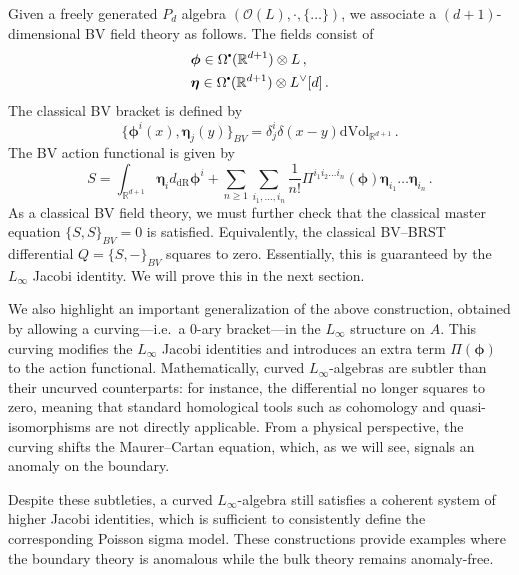 \documentclass[11pt]{article}
\newcommand{\R}{\mathbb{R}}
\newcommand{\derham}{\mathrm{dR}}
\newcommand\sbullet[1][.5]{\mathbin{\vcenter{\hbox{\scalebox{#1}{$\bullet$}}}}}
\numberwithin{equation}{section}
\begin{document}
	
	Given a freely generated $P_d$ algebra $(\mathcal{O}(L),\cdot,\{\dots\})$, we associate a $(d+1)$-dimensional BV field theory as follows. The fields consist of
	\begin{equation}
\begin{aligned}
			&\boldsymbol{\phi} \in \Omega^{\sbullet}(\R^{d+1})\otimes L\,,\\
	&\boldsymbol{\eta} \in \Omega^{\sbullet}(\R^{d+1})\otimes L^\vee[d]\,.
\end{aligned}
	\end{equation}
The classical BV bracket is defined by
\begin{equation}
	\{\boldsymbol{\phi}^i(x),\boldsymbol{\eta}_j(y)\}_{BV} = \delta^i_j\delta(x-y) \mathrm{dVol}_{\R^{d+1}}\,.
\end{equation}
 The BV action functional is given by
 \begin{equation}\label{eq:act_topPSM}
 	S =  \int_{\R^{d+1}}\boldsymbol{\eta}_id_{\derham}\boldsymbol{\phi}^i + \sum_{n \geq 1}\sum_{i_1,\dots, i_n}\frac{1}{n!}\Pi^{i_1i_2\dots i_n}(\boldsymbol{\phi})\boldsymbol{\eta}_{i_1}\dots\boldsymbol{\eta}_{i_n}\,.
 \end{equation}
As a classical BV field theory, we must further check that the classical master equation $\{S,S\}_{BV}=0$ is satisfied. Equivalently, the classical BV--BRST differential $Q=\{S,-\}_{BV}$ squares to zero. Essentially, this is guaranteed by the $L_\infty$ Jacobi identity. We will prove this in the next section.

We also highlight an important generalization of the above construction, obtained by allowing a curving---i.e.\ a $0$-ary bracket---in the $L_\infty$ structure on $A$. This curving modifies the $L_\infty$ Jacobi identities and introduces an extra term $\Pi(\boldsymbol{\phi})$ to the action functional. Mathematically, curved $L_\infty$-algebras are subtler than their uncurved counterparts: for instance, the differential no longer squares to zero, meaning that standard homological tools such as cohomology and quasi-isomorphisms are not directly applicable. From a physical perspective, the curving shifts the Maurer--Cartan equation, which, as we will see, signals an anomaly on the boundary.

Despite these subtleties, a curved $L_\infty$-algebra still satisfies a coherent system of higher Jacobi identities, which is sufficient to consistently define the corresponding Poisson sigma model. These constructions provide examples where the boundary theory is anomalous while the bulk theory remains anomaly-free.
\end{document}
